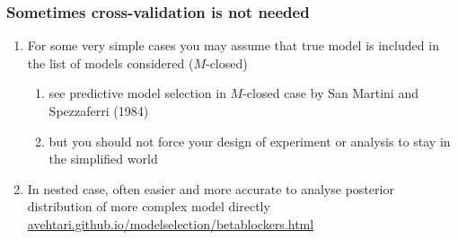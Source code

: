 \documentclass[10pt]{beamer}
\begin{document}
\begin{frame}{}

\frametitle{ Sometimes cross-validation is not needed}

\begin{enumerate}
\item<+-> For some very simple cases you may assume that true model
  is included in the list of models considered ($M$-closed)
  \begin{enumerate}
  \item<+-> see predictive model selection in $M$-closed case by
    San Martini and Spezzaferri (1984)
  \item<+-> but you should not force your design of experiment or
    analysis to stay in the simplified world
  \end{enumerate}
\item<+-> In nested case, often easier and
  more accurate to analyse posterior distribution of more complex
  model directly \\
  {\small \url{avehtari.github.io/modelselection/betablockers.html}}
\end{enumerate}

\end{frame}
\end{document}
